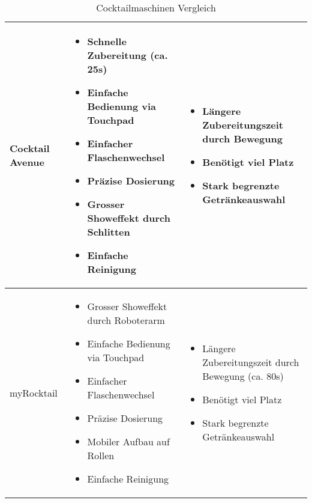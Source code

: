 \begin{table}[h!]
\begin{tabularx}{\textwidth}{|l|X|X|}
Cocktail Avenue   & 

\begin{itemize}[leftmargin=0.3cm,label={--}]
\item Schnelle Zubereitung (ca. 25s)
\item Einfache Bedienung via Touchpad
\item Einfacher Flaschenwechsel
\item Präzise Dosierung
\item Grosser Showeffekt durch Schlitten
\item Einfache Reinigung
\end{itemize}   &

\begin{itemize}[leftmargin=0.3cm,label={--}]
\item Längere Zubereitungszeit durch Bewegung
\item Benötigt viel Platz
\item Stark begrenzte Getränkeauswahl
\end{itemize}   \\
\hline

myRocktail &

\begin{itemize}[leftmargin=0.3cm,label={--}]
\item Grosser Showeffekt durch Roboterarm
\item Einfache Bedienung via Touchpad
\item Einfacher Flaschenwechsel
\item Präzise Dosierung
\item Mobiler Aufbau auf Rollen
\item Einfache Reinigung
\end{itemize}   &

\begin{itemize}[leftmargin=0.3cm,label={--}]
\item Längere Zubereitungszeit durch Bewegung (ca. 80s)
\item Benötigt viel Platz
\item Stark begrenzte Getränkeauswahl
\end{itemize}   \\
\hline
\end{tabularx}
\caption{Cocktailmaschinen Vergleich}
\label{tab:Cocktailmaschinen_Vergleich}
\end{table}
\newpage
